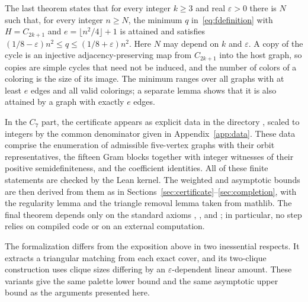 The last theorem states that for every integer $k\ge3$ and real $\varepsilon>0$ there is $N$ such that, for every integer $n\ge N$, the minimum $q$ in~\eqref{eq:fdefinition} with $H=C_{2k+1}$ and $e=\lfloor n^2/4\rfloor+1$ is attained and satisfies $(1/8-\varepsilon)n^2\le q\le(1/8+\varepsilon)n^2$. Here $N$ may depend on $k$ and $\varepsilon$. A copy of the cycle is an injective adjacency-preserving map from $C_{2k+1}$ into the host graph, so copies are simple cycles that need not be induced, and the number of colors of a coloring is the size of its image. The minimum ranges over all graphs with at least $e$ edges and all valid colorings; a separate lemma shows that it is also attained by a graph with exactly $e$ edges.

In the $C_7$ part, the certificate appears as explicit data in the directory , scaled to integers by the common denominator given in Appendix~\ref{app:data}. These data comprise the enumeration of admissible five-vertex graphs with their orbit representatives, the fifteen Gram blocks together with integer witnesses of their positive semidefiniteness, and the coefficient identities. All of these finite statements are checked by the Lean kernel. The weighted and asymptotic bounds are then derived from them as in Sections~\ref{sec:certificate}--\ref{sec:completion}, with the regularity lemma and the triangle removal lemma taken from mathlib. The final theorem depends only on the standard axioms , , and ; in particular, no step relies on compiled code or on an external computation.

The formalization differs from the exposition above in two inessential respects. It extracts a triangular matching from each exact cover, and its two-clique construction uses clique sizes differing by an $\varepsilon$-dependent linear amount. These variants give the same palette lower bound and the same asymptotic upper bound as the arguments presented here.
